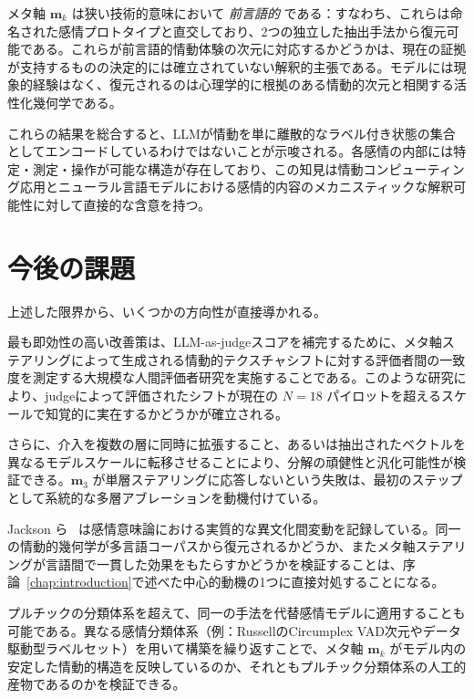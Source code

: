 メタ軸 $\mathbf{m}_k$ は狭い技術的意味において \emph{前言語的} である：すなわち、これらは命名された感情プロトタイプと直交しており、2つの独立した抽出手法から復元可能である。これらが前言語的情動体験の次元に対応するかどうかは、現在の証拠が支持するものの決定的には確立されていない解釈的主張である。モデルには現象的経験はなく、復元されるのは心理学的に根拠のある情動的次元と相関する活性化幾何学である。\par

これらの結果を総合すると、LLMが情動を単に離散的なラベル付き状態の集合としてエンコードしているわけではないことが示唆される。各感情の内部には特定・測定・操作が可能な構造が存在しており、この知見は情動コンピューティング応用とニューラル言語モデルにおける感情的内容のメカニスティックな解釈可能性に対して直接的な含意を持つ。

\section{今後の課題}
\label{sec:future-work}

上述した限界から、いくつかの方向性が直接導かれる。

最も即効性の高い改善策は、LLM-as-judgeスコアを補完するために、メタ軸ステアリングによって生成される情動的テクスチャシフトに対する評価者間の一致度を測定する大規模な人間評価者研究を実施することである。このような研究により、judgeによって評価されたシフトが現在の $N = 18$ パイロットを超えるスケールで知覚的に実在するかどうかが確立される。\par

さらに、介入を複数の層に同時に拡張すること、あるいは抽出されたベクトルを異なるモデルスケールに転移させることにより、分解の頑健性と汎化可能性が検証できる。$\mathbf{m}_3$ が単層ステアリングに応答しないという失敗は、最初のステップとして系統的な多層アブレーションを動機付けている。\par

Jackson ら~\cite{jackson2019emotion} は感情意味論における実質的な異文化間変動を記録している。同一の情動的幾何学が多言語コーパスから復元されるかどうか、またメタ軸ステアリングが言語間で一貫した効果をもたらすかどうかを検証することは、序論~\ref{chap:introduction}で述べた中心的動機の1つに直接対処することになる。\par

プルチックの分類体系を超えて、同一の手法を代替感情モデルに適用することも可能である。異なる感情分類体系（例：RussellのCircumplex VAD次元やデータ駆動型ラベルセット）を用いて構築を繰り返すことで、メタ軸 $\mathbf{m}_k$ がモデル内の安定した情動的構造を反映しているのか、それともプルチック分類体系の人工的産物であるのかを検証できる。\par
